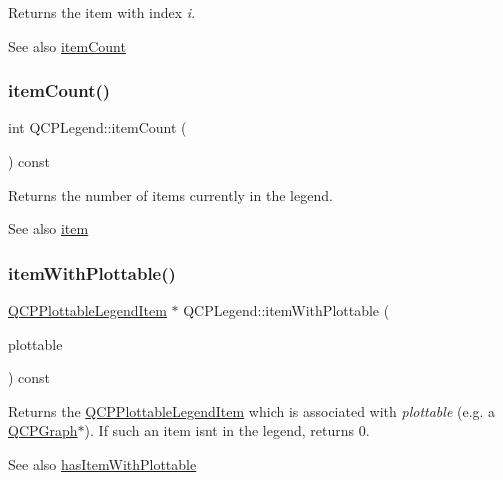 Returns the item with index {\itshape i}.

\begin{DoxySeeAlso}{See also}
\hyperlink{class_q_c_p_legend_a57ab86ab8b2a3762d4c1455eb5452c88}{item\+Count} 
\end{DoxySeeAlso}
\hypertarget{class_q_c_p_legend_a57ab86ab8b2a3762d4c1455eb5452c88}{}\label{class_q_c_p_legend_a57ab86ab8b2a3762d4c1455eb5452c88} 
\subsubsection{\texorpdfstring{item\+Count()}{itemCount()}}
{\footnotesize\ttfamily int Q\+C\+P\+Legend\+::item\+Count (\begin{DoxyParamCaption}{ }\end{DoxyParamCaption}) const}

Returns the number of items currently in the legend. \begin{DoxySeeAlso}{See also}
\hyperlink{class_q_c_p_legend_acfe9694c45104a3359d3806ed366fcf7}{item} 
\end{DoxySeeAlso}
\hypertarget{class_q_c_p_legend_a91e790002d8bf15a20628a8e8841e397}{}\label{class_q_c_p_legend_a91e790002d8bf15a20628a8e8841e397} 
\subsubsection{\texorpdfstring{item\+With\+Plottable()}{itemWithPlottable()}}
{\footnotesize\ttfamily \hyperlink{class_q_c_p_plottable_legend_item}{Q\+C\+P\+Plottable\+Legend\+Item} $\ast$ Q\+C\+P\+Legend\+::item\+With\+Plottable (\begin{DoxyParamCaption}\item[{const \hyperlink{class_q_c_p_abstract_plottable}{Q\+C\+P\+Abstract\+Plottable} $\ast$}]{plottable }\end{DoxyParamCaption}) const}

Returns the \hyperlink{class_q_c_p_plottable_legend_item}{Q\+C\+P\+Plottable\+Legend\+Item} which is associated with {\itshape plottable} (e.\+g. a \hyperlink{class_q_c_p_graph}{Q\+C\+P\+Graph}$\ast$). If such an item isn\textquotesingle{}t in the legend, returns 0.

\begin{DoxySeeAlso}{See also}
\hyperlink{class_q_c_p_legend_a4b90a442af871582df85c2bc13f91e88}{has\+Item\+With\+Plottable} 
\end{DoxySeeAlso}
\hypertarget{class_q_c_p_legend_ac91595c3eaa746fe6321d2eb952c63bb}{}\label{class_q_c_p_legend_ac91595c3eaa746fe6321d2eb952c63bb} 
